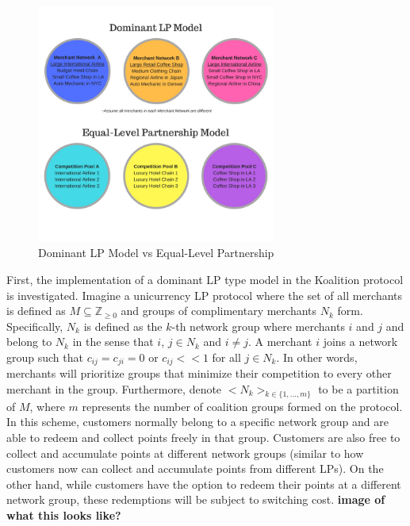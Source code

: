 \begin{figure}[h]
	\centering
	\includegraphics[keepaspectratio, width=0.7\textwidth]{images/DomEqual}
	\caption{Dominant LP Model vs Equal-Level Partnership} \label{fig:DomEqual}
\end{figure}

First, the implementation of a dominant LP type model in the Koalition protocol is investigated. Imagine a unicurrency LP protocol where the set of all merchants is defined as $M \subseteq \mathbb{Z}_{\geq 0}$ and  
groups of complimentary merchants $N_k$ form. Specifically, $N_k$ is defined as the $k$-th network group where merchants $i$ and $j$ and belong to $N_k$ in the sense that $i$, $j \in N_k$ and $i \neq j$. A merchant $i$ joins a network group such that $c_{ij} = c_{ji} = 0$ or $c_{ij} << 1$ for all $j \in N_k$. In other words, merchants will prioritize groups that minimize their competition to every other merchant in the group. Furthermore, denote $<N_k>_{k \in \{1,...,m\}}$ to be a partition of $M$, where $m$ represents the number of coalition groups formed on the protocol. In this scheme, customers normally belong to a specific network group and are able to redeem and collect points freely in that group. Customers are also free to collect and accumulate points at different network groups (similar to how customers now can collect and accumulate points from different LPs). On the other hand, while customers have the option to redeem their points at a different network group, these redemptions will be subject to switching cost. \textbf{image of what this looks like?}

